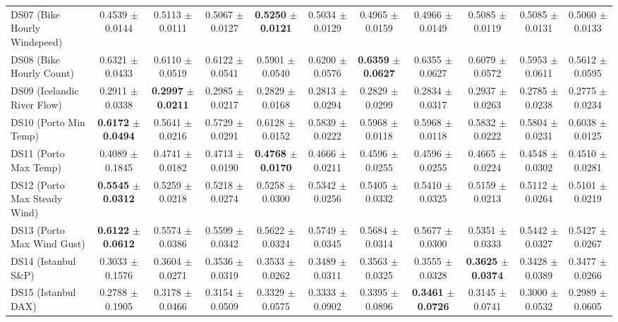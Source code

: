 \begin{table}[t]
{{\begin{tabular}{lcccccccccc}
DS07 (Bike Hourly Windspeed) & 0.4539 $\pm$ 0.0144 & 0.5113 $\pm$ 0.0111 & 0.5067 $\pm$ 0.0127 & \textbf{0.5250} $\pm$ \textbf{0.0121} & 0.5034 $\pm$ 0.0129 & 0.4965 $\pm$ 0.0159 & 0.4966 $\pm$ 0.0149 & 0.5085 $\pm$ 0.0119 & 0.5085 $\pm$ 0.0131 & 0.5060 $\pm$ 0.0133 \\
DS08 (Bike Hourly Count) & 0.6321 $\pm$ 0.0433 & 0.6110 $\pm$ 0.0519 & 0.6122 $\pm$ 0.0541 & 0.5901 $\pm$ 0.0540 & 0.6200 $\pm$ 0.0576 & \textbf{0.6359} $\pm$ \textbf{0.0627} & 0.6355 $\pm$ 0.0627 & 0.6079 $\pm$ 0.0572 & 0.5953 $\pm$ 0.0611 & 0.5612 $\pm$ 0.0595 \\
DS09 (Icelandic River Flow) & 0.2911 $\pm$ 0.0338 & \textbf{0.2997} $\pm$ \textbf{0.0211} & 0.2985 $\pm$ 0.0217 & 0.2829 $\pm$ 0.0168 & 0.2813 $\pm$ 0.0294 & 0.2829 $\pm$ 0.0299 & 0.2834 $\pm$ 0.0317 & 0.2937 $\pm$ 0.0263 & 0.2785 $\pm$ 0.0238 & 0.2775 $\pm$ 0.0234 \\
DS10 (Porto Min Temp) & \textbf{0.6172} $\pm$ \textbf{0.0494} & 0.5641 $\pm$ 0.0216 & 0.5729 $\pm$ 0.0291 & 0.6128 $\pm$ 0.0152 & 0.5839 $\pm$ 0.0222 & 0.5968 $\pm$ 0.0118 & 0.5968 $\pm$ 0.0118 & 0.5832 $\pm$ 0.0222 & 0.5804 $\pm$ 0.0231 & 0.6038 $\pm$ 0.0125 \\
DS11 (Porto Max Temp) & 0.4089 $\pm$ 0.1845 & 0.4741 $\pm$ 0.0182 & 0.4713 $\pm$ 0.0190 & \textbf{0.4768} $\pm$ \textbf{0.0170} & 0.4666 $\pm$ 0.0211 & 0.4596 $\pm$ 0.0255 & 0.4596 $\pm$ 0.0255 & 0.4665 $\pm$ 0.0224 & 0.4548 $\pm$ 0.0302 & 0.4510 $\pm$ 0.0281 \\
DS12 (Porto Max Steady Wind) & \textbf{0.5545} $\pm$ \textbf{0.0312} & 0.5259 $\pm$ 0.0218 & 0.5218 $\pm$ 0.0274 & 0.5258 $\pm$ 0.0300 & 0.5342 $\pm$ 0.0256 & 0.5405 $\pm$ 0.0332 & 0.5410 $\pm$ 0.0325 & 0.5159 $\pm$ 0.0213 & 0.5112 $\pm$ 0.0264 & 0.5101 $\pm$ 0.0219 \\
DS13 (Porto Max Wind Gust) & \textbf{0.6122} $\pm$ \textbf{0.0612} & 0.5574 $\pm$ 0.0386 & 0.5599 $\pm$ 0.0342 & 0.5622 $\pm$ 0.0324 & 0.5749 $\pm$ 0.0345 & 0.5684 $\pm$ 0.0314 & 0.5677 $\pm$ 0.0300 & 0.5351 $\pm$ 0.0333 & 0.5442 $\pm$ 0.0327 & 0.5427 $\pm$ 0.0267 \\
DS14 (Istanbul S\&P) & 0.3033 $\pm$ 0.1576 & 0.3604 $\pm$ 0.0271 & 0.3536 $\pm$ 0.0319 & 0.3533 $\pm$ 0.0262 & 0.3489 $\pm$ 0.0311 & 0.3563 $\pm$ 0.0325 & 0.3555 $\pm$ 0.0328 & \textbf{0.3625} $\pm$ \textbf{0.0374} & 0.3428 $\pm$ 0.0389 & 0.3477 $\pm$ 0.0266 \\
DS15 (Istanbul DAX) & 0.2788 $\pm$ 0.1905 & 0.3178 $\pm$ 0.0466 & 0.3154 $\pm$ 0.0509 & 0.3329 $\pm$ 0.0575 & 0.3333 $\pm$ 0.0902 & 0.3395 $\pm$ 0.0896 & \textbf{0.3461} $\pm$ \textbf{0.0726} & 0.3145 $\pm$ 0.0741 & 0.3000 $\pm$ 0.0532 & 0.2989 $\pm$ 0.0605 \\

\end{tabular}}}
\end{table}
